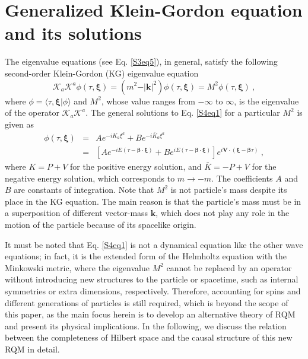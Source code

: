 \documentclass[12pt]{iopart}
\begin{document}
\section{Generalized Klein-Gordon equation and its solutions}

The eigenvalue equations (see Eq. \ref{S3eq5}), in general, satisfy the following 
second-order Klein-Gordon (KG) eigenvalue equation
%
    \begin{equation}
        \mathcal{K}_a\mathcal{K}^a\phi\left(\tau,\boldsymbol{\xi}\right)=
        \left(m^2-\vert\boldsymbol{k}\vert^2\right)\phi\left(\tau,\boldsymbol{\xi}\right)=
        M^2\phi\left(\tau,\boldsymbol{\xi}\right)\ ,
        \label{S4eq1}
    \end{equation}
%
where $\phi=\langle\tau,\boldsymbol{\xi}\vert\phi\rangle$ and $M^2$, whose value ranges 
from $-\infty$ to $\infty$, is the eigenvalue of the operator $\mathcal{K}_a\mathcal{K}^a$.
The general solutions to Eq. {\ref{S4eq1}} for a particular $M^2$ is given as
%
    \begin{eqnarray}
        \phi \left(\tau,\boldsymbol{\xi}\right) &=& A e^{-i K_a\xi^a}+Be^{-i\bar{K}_a\xi^a} \nonumber\\
        &=& \left[Ae^{-iE(\tau-\boldsymbol{\beta}\cdot\boldsymbol{\xi})}+
        Be^{iE(\tau-\boldsymbol{\beta}\cdot\boldsymbol{\xi})}\right]
        e^{i\boldsymbol{V}\cdot(\boldsymbol{\xi}-\boldsymbol{\beta}\tau)}\ ,
        \label{S4eq3}
    \end{eqnarray}
%
where $K=P+V$ for the positive energy solution, and $\bar{K}=-P+V$ for the negative 
energy solution, which corresponds to $m\to -m$.  The coefficients $A$ and $B$ are 
constants of integration.  Note that $M^2$ is not particle's mass despite its place in the 
KG equation.  The main reason is that the particle's mass must be in a superposition of 
different vector-mass $\boldsymbol{k}$, which does not play any role in the motion of 
the particle because of its spacelike origin.  

It must be noted that Eq. {\ref{S4eq1}} is not a dynamical equation like the other wave 
equations; in fact, it is the extended form of the Helmholtz equation with the Minkowski 
metric, where the eigenvalue $M^2$ cannot be replaced by an operator without 
introducing new structures to the particle or spacetime, such as internal symmetries or 
extra dimensions, respectively.  Therefore, accounting for spins and different generations
of particles is still required, which is beyond the scope of this paper, as the main focus 
herein is to develop an alternative theory of RQM and present its physical implications.  
In the following, we discuss the relation between the completeness of Hilbert space and 
the causal structure of this new RQM in detail.
%
\end{document}
